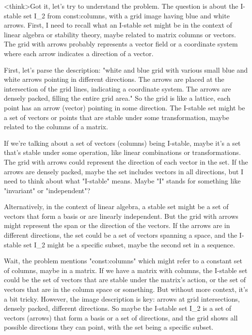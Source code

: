 <think>Got it, let's try to understand the problem. The question is about the I-stable set I_2 from const:columns, with a grid image having blue and white arrows. First, I need to recall what an I-stable set might be in the context of linear algebra or stability theory, maybe related to matrix columns or vectors. The grid with arrows probably represents a vector field or a coordinate system where each arrow indicates a direction of a vector. 

First, let's parse the description: "white and blue grid with various small blue and white arrows pointing in different directions. The arrows are placed at the intersection of the grid lines, indicating a coordinate system. The arrows are densely packed, filling the entire grid area." So the grid is like a lattice, each point has an arrow (vector) pointing in some direction. The I-stable set might be a set of vectors or points that are stable under some transformation, maybe related to the columns of a matrix. 

If we're talking about a set of vectors (columns) being I-stable, maybe it's a set that's stable under some operation, like linear combinations or transformations. The grid with arrows could represent the direction of each vector in the set. If the arrows are densely packed, maybe the set includes vectors in all directions, but I need to think about what "I-stable" means. Maybe "I" stands for something like "invariant" or "independent"? 

Alternatively, in the context of linear algebra, a stable set might be a set of vectors that form a basis or are linearly independent. But the grid with arrows might represent the span or the direction of the vectors. If the arrows are in different directions, the set could be a set of vectors spanning a space, and the I-stable set I_2 might be a specific subset, maybe the second set in a sequence. 

Wait, the problem mentions "const:columns" which might refer to a constant set of columns, maybe in a matrix. If we have a matrix with columns, the I-stable set could be the set of vectors that are stable under the matrix's action, or the set of vectors that are in the column space or something. But without more context, it's a bit tricky. However, the image description is key: arrows at grid intersections, densely packed, different directions. So maybe the I-stable set I_2 is a set of vectors (arrows) that form a basis or a set of directions, and the grid shows all possible directions they can point, with the set being a specific subset. 

